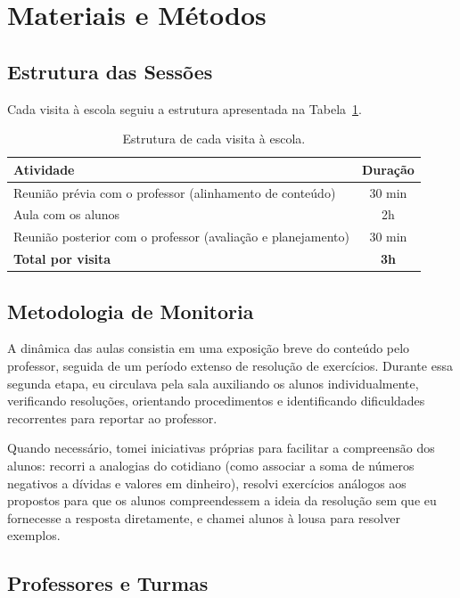 \documentclass[11pt]{article}
\begin{document}
\section{Materiais e Métodos}

\subsection{Estrutura das Sessões}

Cada visita à escola seguiu a estrutura apresentada na Tabela~\ref{tab:estrutura}.

\begin{table}[h]
\centering
\begin{tabular}{lc}
\toprule
\textbf{Atividade} & \textbf{Duração} \\
\midrule
Reunião prévia com o professor (alinhamento de conteúdo) & 30 min \\
Aula com os alunos & 2h \\
Reunião posterior com o professor (avaliação e planejamento) & 30 min \\
\midrule
\textbf{Total por visita} & \textbf{3h} \\
\bottomrule
\end{tabular}
\caption{Estrutura de cada visita à escola.}
\label{tab:estrutura}
\end{table}

\subsection{Metodologia de Monitoria}

A dinâmica das aulas consistia em uma exposição breve do conteúdo pelo professor, seguida de um período extenso de resolução de exercícios. Durante essa segunda etapa, eu circulava pela sala auxiliando os alunos individualmente, verificando resoluções, orientando procedimentos e identificando dificuldades recorrentes para reportar ao professor.

Quando necessário, tomei iniciativas próprias para facilitar a compreensão dos alunos: recorri a analogias do cotidiano (como associar a soma de números negativos a dívidas e valores em dinheiro), resolvi exercícios análogos aos propostos para que os alunos compreendessem a ideia da resolução sem que eu fornecesse a resposta diretamente, e chamei alunos à lousa para resolver exemplos.

\subsection{Professores e Turmas}
\end{document}
